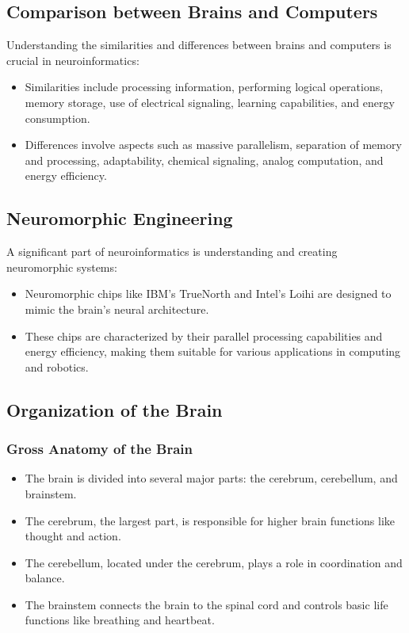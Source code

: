 \documentclass{article}
\begin{document}
\subsection{Comparison between Brains and Computers}
Understanding the similarities and differences between brains and computers is crucial in neuroinformatics:
\begin{itemize}
    \item Similarities include processing information, performing logical operations, memory storage, use of electrical signaling, learning capabilities, and energy consumption.
    \item Differences involve aspects such as massive parallelism, separation of memory and processing, adaptability, chemical signaling, analog computation, and energy efficiency.
\end{itemize}

\subsection{Neuromorphic Engineering}
A significant part of neuroinformatics is understanding and creating neuromorphic systems:
\begin{itemize}
    \item Neuromorphic chips like IBM's TrueNorth and Intel's Loihi are designed to mimic the brain's neural architecture.
    \item These chips are characterized by their parallel processing capabilities and energy efficiency, making them suitable for various applications in computing and robotics.
\end{itemize}

\subsection{Organization of the Brain}
\subsubsection{Gross Anatomy of the Brain}
\begin{itemize}
    \item The brain is divided into several major parts: the cerebrum, cerebellum, and brainstem.
    \item The cerebrum, the largest part, is responsible for higher brain functions like thought and action.
    \item The cerebellum, located under the cerebrum, plays a role in coordination and balance.
    \item The brainstem connects the brain to the spinal cord and controls basic life functions like breathing and heartbeat.
\end{itemize}
\end{document}
